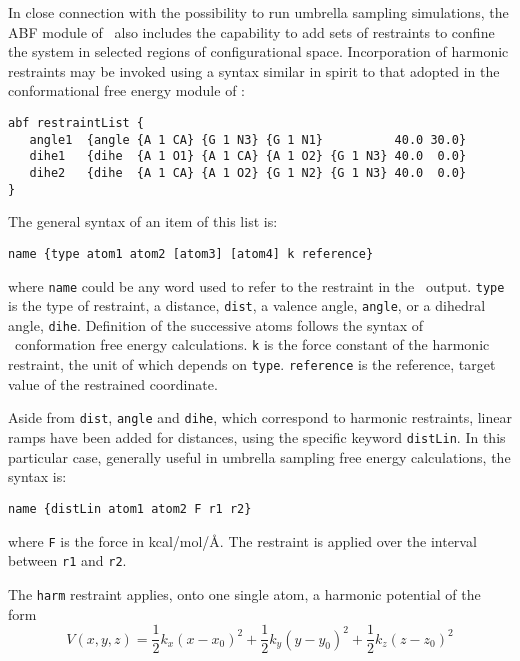 In close connection with the possibility to run umbrella sampling simulations, the
ABF module of \namd \ also includes the capability to add sets of
restraints to confine the system in selected regions of configurational
space. Incorporation of harmonic restraints may be invoked using a syntax
similar in spirit to that adopted in the conformational free energy
module of \namd:


\begin{verbatim}
abf restraintList {
   angle1  {angle {A 1 CA} {G 1 N3} {G 1 N1}          40.0 30.0}
   dihe1   {dihe  {A 1 O1} {A 1 CA} {A 1 O2} {G 1 N3} 40.0  0.0}
   dihe2   {dihe  {A 1 CA} {A 1 O2} {G 1 N2} {G 1 N3} 40.0  0.0}
}
\end{verbatim}


The general syntax of an item of this list is:

\begin{verbatim}
name {type atom1 atom2 [atom3] [atom4] k reference}
\end{verbatim}


where {\tt name} could be any word used to refer to the restraint in the
\namd \ output. {\tt type} is the type of restraint, \ie a distance,
{\tt dist}, a valence angle, {\tt angle}, or a dihedral angle, {\tt dihe}.
Definition of the successive atoms follows the syntax of \namd \
conformation free energy calculations. {\tt k} is the force constant
of the harmonic restraint, the unit of which depends on
{\tt type}. {\tt reference} is the reference, target value of
the restrained coordinate.


Aside from {\tt dist}, {\tt angle} and {\tt dihe}, which correspond to
harmonic restraints, linear ramps have been added for distances, using
the specific keyword {\tt distLin}. In this particular case, generally
useful in umbrella sampling free energy calculations, the syntax is:


\begin{verbatim}
name {distLin atom1 atom2 F r1 r2}
\end{verbatim}


where {\tt F} is the force in kcal/mol/\AA. The restraint is
applied over the interval between {\tt r1} and {\tt r2}.

The {\tt harm} restraint applies, onto one single atom, a harmonic potential
of the form\\
\begin{displaymath}
V(x,y,z) = \frac{1}{2} k_x (x-x_0)^2
+ \frac{1}{2} k_y (y-y_0)^2 + \frac{1}{2} k_z (z-z_0)^2
\end{displaymath}

